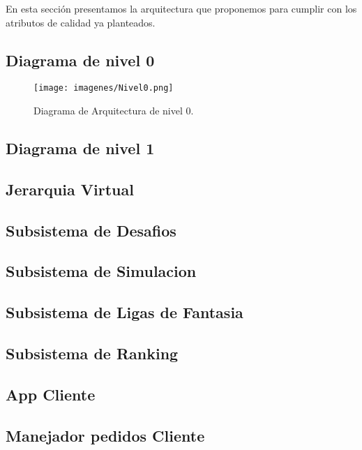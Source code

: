 En esta sección presentamos la arquitectura que proponemos para cumplir con los atributos de calidad
ya planteados.

\subsection{Diagrama de nivel 0}
\begin{figure}[H]
  \centering
  \texttt{[image: imagenes/Nivel0.png]}
  \caption{Diagrama de Arquitectura de nivel 0.}
\end{figure}
\newpage

\subsection{Diagrama de nivel 1}

\newpage

\subsection{Jerarquia Virtual}

\newpage

\subsection{Subsistema de Desafios}

\newpage

\subsection{Subsistema de Simulacion}

\newpage

\subsection{Subsistema de Ligas de Fantasia}

\newpage

\subsection{Subsistema de Ranking}

\newpage

\subsection{App Cliente}

\newpage

\subsection{Manejador pedidos Cliente}

\newpage

